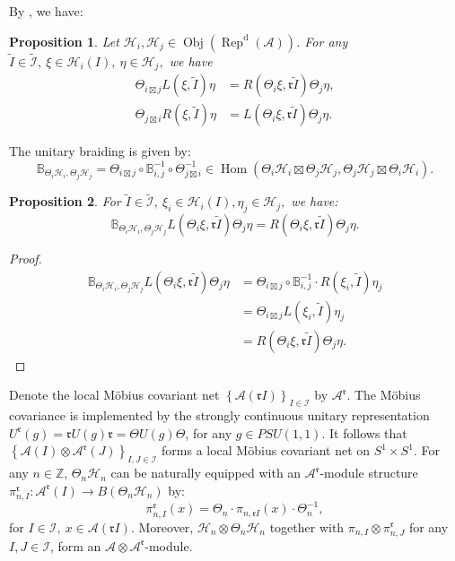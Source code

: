 \documentclass{article}
\newtheorem{proposition}{Proposition}
\newcommand{\hilb}{\mathcal{H}}
\newcommand{\A}{\mathcal{A}}
\newcommand{\Z}{\mathbb{Z}}
\begin{document}
By \cite[Theorem 6.4]{gui2021bisognano}, we have:
\begin{proposition}
    Let $\hilb_i , \hilb_j\in \operatorname{Obj}(\operatorname{Rep}^{\operatorname{d}}(\A))$. For any $\widetilde{I}\in\widetilde{\mathcal{I}}, \ \xi\in\hilb_i(I),\  \eta\in\hilb_j, $ we have
    \begin{align*}
            \Theta_{i\boxtimes j}L(\xi, \widetilde{I})\eta &= R(\Theta_i\xi, \mathfrak{r}\widetilde{I})\Theta_j\eta, \\
            \Theta_{j\boxtimes i}R(\xi, \widetilde{I})\eta & = L(\Theta_i\xi, \mathfrak{r}\widetilde{I})\Theta_j\eta.
    \end{align*}
    
\end{proposition}

The unitary braiding is given by:
\[
\mathbb{B}_{\Theta_i\hilb_i, \Theta_j\hilb_j } = \Theta_{i\boxtimes j} \circ \mathbb{B}_{i,j}^{-1} \circ \Theta_{j\boxtimes i}^{-1}\in \operatorname{Hom}(\Theta_i\hilb_i\boxtimes \Theta_j\hilb_j, \Theta_j \hilb_j \boxtimes \Theta_i\hilb_i).
\]

\begin{proposition}\label{braidexchange}
    For $\widetilde{I}\in\widetilde{\mathcal{I}}, \ \xi_i\in\hilb_i(I), \eta_j \in \hilb_j, $ we have: 
    \[
    \mathbb{B}_{\Theta_i\hilb_i, \Theta_j\hilb_j } L(\Theta_i\xi, \mathfrak{r}\widetilde{I}) \Theta_j\eta = 
    R(\Theta_i\xi, \mathfrak{r}\widetilde{I})\Theta_j\eta.
    \]
\end{proposition}
\begin{proof}
    \begin{align*}
         \mathbb{B}_{\Theta_i\hilb_i, \Theta_j\hilb_j } L(\Theta_i\xi, \mathfrak{r}\widetilde{I}) \Theta_j\eta & = \Theta_{i\boxtimes j}\circ \mathbb{B}_{i,j}^{-1}\cdot R(\xi_i,\widetilde{I})\eta_j \\
         &= \Theta_{i\boxtimes j} L(\xi_i,\widetilde{I})\eta_j\\
         &= R(\Theta_i\xi, \mathfrak{r}\widetilde{I})\Theta_j\eta.
    \end{align*}
\end{proof}




Denote the local M\"{o}bius covariant net $\left\{\A(\mathfrak{r}I)\right\}_{I\in\mathcal{I}}$ by $\A^{\mathfrak{r}}$. The M\"{o}bius covariance is implemented by the strongly continuous unitary representation $U^\mathfrak{r}(g) = \mathfrak{r} U(g) \mathfrak{r} = \Theta U(g) \Theta $, for any $g\in{PSU}(1,1)$. 
It follows that $\left\{\A(I) \otimes \A^\mathfrak{r}(J) \right\}_{I,J\in\mathcal{I}}$ forms a local 
M\"{o}bius covariant net on $S^1 \times S^1$. 
For any $n\in\Z$, $\Theta_n\hilb_n$ can be naturally equipped 
with an $\A^\mathfrak{r}$-module structure $\pi^{\mathfrak{r}}_{n, I}: \A^\mathfrak{r}(I) \to B(\Theta_n\hilb_n) $ by:
\[
\pi^{\mathfrak{r}}_{n, I}(x) = \Theta_n \cdot \pi_{n,\mathfrak{r}I}(x) \cdot \Theta^{-1}_n, 
\]
for $I \in \mathcal{I}, \ x\in \A(\mathfrak{r}I) $. Moreover, 
$\hilb_n \otimes \Theta_n \hilb_n$ together with 
$\pi_{n, I}\otimes \pi_{n, J}^\mathfrak{r}$ for any $I, J \in \mathcal{I}$, 
form an $\A \otimes \A^\mathfrak{r}$-module.
\end{document}
